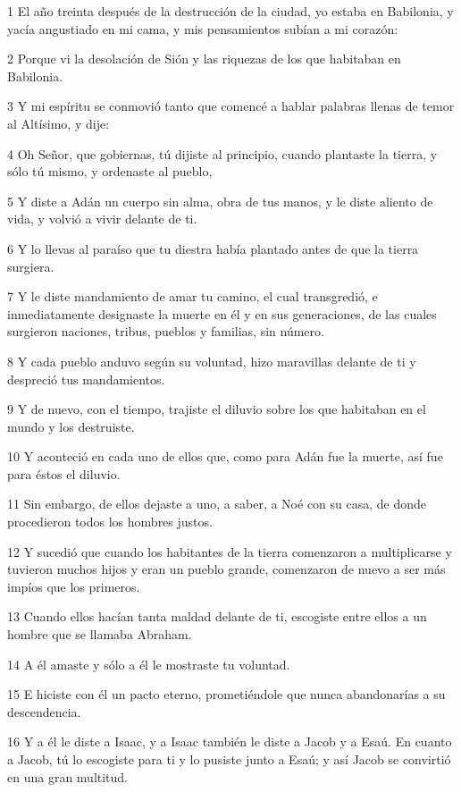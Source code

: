 \par 1 El año treinta después de la destrucción de la ciudad, yo estaba en Babilonia, y yacía angustiado en mi cama, y ​​mis pensamientos subían a mi corazón:
\par 2 Porque vi la desolación de Sión y las riquezas de los que habitaban en Babilonia.
\par 3 Y mi espíritu se conmovió tanto que comencé a hablar palabras llenas de temor al Altísimo, y dije:
\par 4 Oh Señor, que gobiernas, tú dijiste al principio, cuando plantaste la tierra, y sólo tú mismo, y ordenaste al pueblo,
\par 5 Y diste a Adán un cuerpo sin alma, obra de tus manos, y le diste aliento de vida, y volvió a vivir delante de ti.
\par 6 Y lo llevas al paraíso que tu diestra había plantado antes de que la tierra surgiera.
\par 7 Y le diste mandamiento de amar tu camino, el cual transgredió, e inmediatamente designaste la muerte en él y en sus generaciones, de las cuales surgieron naciones, tribus, pueblos y familias, sin número.
\par 8 Y cada pueblo anduvo según su voluntad, hizo maravillas delante de ti y despreció tus mandamientos.
\par 9 Y de nuevo, con el tiempo, trajiste el diluvio sobre los que habitaban en el mundo y los destruiste.
\par 10 Y aconteció en cada uno de ellos que, como para Adán fue la muerte, así fue para éstos el diluvio.
\par 11 Sin embargo, de ellos dejaste a uno, a saber, a Noé con su casa, de donde procedieron todos los hombres justos.
\par 12 Y sucedió que cuando los habitantes de la tierra comenzaron a multiplicarse y tuvieron muchos hijos y eran un pueblo grande, comenzaron de nuevo a ser más impíos que los primeros.
\par 13 Cuando ellos hacían tanta maldad delante de ti, escogiste entre ellos a un hombre que se llamaba Abraham.
\par 14 A él amaste y sólo a él le mostraste tu voluntad.
\par 15 E hiciste con él un pacto eterno, prometiéndole que nunca abandonarías a su descendencia.
\par 16 Y a él le diste a Isaac, y a Isaac también le diste a Jacob y a Esaú. En cuanto a Jacob, tú lo escogiste para ti y lo pusiste junto a Esaú; y así Jacob se convirtió en una gran multitud.
